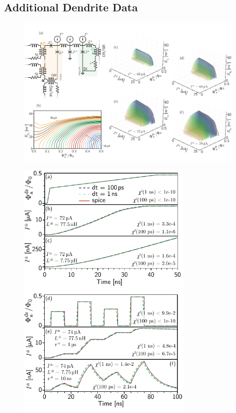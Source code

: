\documentclass[twocolumn]{article}
\begin{document}
\subsection{\label{apx:dendrites_additional_data}Additional Dendrite Data}


\begin{figure}[t]
\includegraphics[width=17.2cm]{figures/_fig__dendrites__circuits__responses__4jj.pdf}
\end{figure}

\begin{figure}[h!]
\includegraphics[width=8.6cm]{figures/_fig__dendrites__comparison__4jj__main.pdf}
\end{figure}
\end{document}
